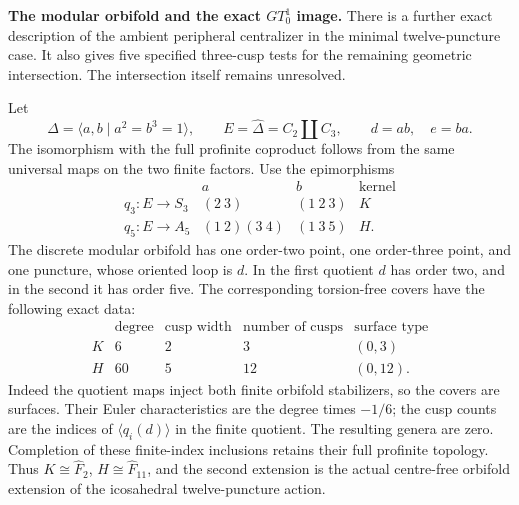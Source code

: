 \medskip\noindent\textbf{The modular orbifold and the exact $GT_0^1$ image.}
There is a further exact description of the ambient peripheral
centralizer in the minimal twelve-puncture case.  It also gives
five specified three-cusp tests for the remaining geometric
intersection.  The intersection itself remains unresolved.

Let
\[
 \Delta=\langle a,b\mid a^2=b^3=1\rangle,
 \qquad E=\widehat\Delta=C_2\amalg C_3,
 \qquad d=ab,\quad e=ba.                                \tag{F.7.19}
\]
The isomorphism with the full profinite coproduct follows from
the same universal maps on the two finite factors.
Use the epimorphisms
\[
 \begin{array}{c|cc|c}
     &a&b&\text{kernel}\\ \hline
 q_3:E\to S_3 &(2\ 3)&(1\ 2\ 3)&K\\
 q_5:E\to A_5 &(1\ 2)(3\ 4)&(1\ 3\ 5)&H .
 \end{array}                                             \tag{F.7.20}
\]
The discrete modular orbifold has one order-two point,
one order-three point, and one puncture, whose oriented
loop is $d$.  In the first quotient $d$ has order two,
and in the second it has order five.  The corresponding
torsion-free covers have the following exact data:
\[
 \begin{array}{c|c|c|c|c}
  &\text{degree}&\text{cusp width}&\text{number of cusps}
        &\text{surface type}\\ \hline
  K&6&2&3&(0,3)\\
  H&60&5&12&(0,12).
 \end{array}                                             \tag{F.7.21}
\]
Indeed the quotient maps inject both finite orbifold
stabilizers, so the covers are surfaces.  Their Euler
characteristics are the degree times $-1/6$; the cusp
counts are the indices of $\langle q_i(d)\rangle$ in
the finite quotient.  The resulting genera are zero.
Completion of these finite-index inclusions retains their
full profinite topology.  Thus $K\cong\widehat F_2$,
$H\cong\widehat F_{11}$, and the second extension is
the actual centre-free orbifold extension of the
icosahedral twelve-puncture action.

